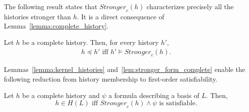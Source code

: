 


The following result states that $\mathit{Stronger}_c(h)$ characterizes precisely
all the histories stronger than $h$. It is a direct consequence of Lemma~\ref{lemma:complete_history}.

\begin{lemma}\label{lem:stronger_form_complete}

Let $h$ be a complete history. Then, for every history $h'$,
\begin{align*}
h\preceq h'\text{ iff }h'\models \mathit{Stronger}_c(h).
\end{align*}

\end{lemma}

Lemmas~\ref{lemma:kernel_histories} and~\ref{lem:stronger_form_complete} enable the following 
reduction from history membership to first-order satisfiability.

\begin{theorem}\label{th:satisfiability_pending}
Let $h$ be a complete history and $\psi$ a formula describing a basis of $L$.
Then,
\[
h\in H(L)\mbox{ iff }\mathit{Stronger}_c(h)\land \psi\mbox{ is satisfiable.}
\]
\end{theorem}
%
%

